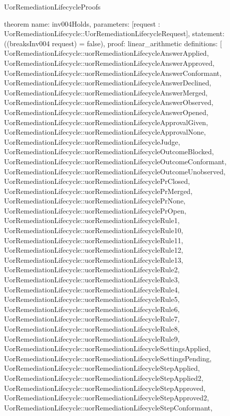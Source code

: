 \begin{lexlean}{UorRemediationLifecycleProofs}
\begin{semanticmodule}
theorem{
  name: inv004Holds,
  parameters: [request : UorRemediationLifecycle::UorRemediationLifecycleRequest],
  statement: ((breaksInv004 request) = false),
  proof: linear_arithmetic{
    definitions: [
      UorRemediationLifecycle::uorRemediationLifecycleAnswerApplied,
      UorRemediationLifecycle::uorRemediationLifecycleAnswerApproved,
      UorRemediationLifecycle::uorRemediationLifecycleAnswerConformant,
      UorRemediationLifecycle::uorRemediationLifecycleAnswerDeclined,
      UorRemediationLifecycle::uorRemediationLifecycleAnswerMerged,
      UorRemediationLifecycle::uorRemediationLifecycleAnswerObserved,
      UorRemediationLifecycle::uorRemediationLifecycleAnswerOpened,
      UorRemediationLifecycle::uorRemediationLifecycleApprovalGiven,
      UorRemediationLifecycle::uorRemediationLifecycleApprovalNone,
      UorRemediationLifecycle::uorRemediationLifecycleJudge,
      UorRemediationLifecycle::uorRemediationLifecycleOutcomeBlocked,
      UorRemediationLifecycle::uorRemediationLifecycleOutcomeConformant,
      UorRemediationLifecycle::uorRemediationLifecycleOutcomeUnobserved,
      UorRemediationLifecycle::uorRemediationLifecyclePrClosed,
      UorRemediationLifecycle::uorRemediationLifecyclePrMerged,
      UorRemediationLifecycle::uorRemediationLifecyclePrNone,
      UorRemediationLifecycle::uorRemediationLifecyclePrOpen,
      UorRemediationLifecycle::uorRemediationLifecycleRule1,
      UorRemediationLifecycle::uorRemediationLifecycleRule10,
      UorRemediationLifecycle::uorRemediationLifecycleRule11,
      UorRemediationLifecycle::uorRemediationLifecycleRule12,
      UorRemediationLifecycle::uorRemediationLifecycleRule13,
      UorRemediationLifecycle::uorRemediationLifecycleRule2,
      UorRemediationLifecycle::uorRemediationLifecycleRule3,
      UorRemediationLifecycle::uorRemediationLifecycleRule4,
      UorRemediationLifecycle::uorRemediationLifecycleRule5,
      UorRemediationLifecycle::uorRemediationLifecycleRule6,
      UorRemediationLifecycle::uorRemediationLifecycleRule7,
      UorRemediationLifecycle::uorRemediationLifecycleRule8,
      UorRemediationLifecycle::uorRemediationLifecycleRule9,
      UorRemediationLifecycle::uorRemediationLifecycleSettingsApplied,
      UorRemediationLifecycle::uorRemediationLifecycleSettingsPending,
      UorRemediationLifecycle::uorRemediationLifecycleStepApplied,
      UorRemediationLifecycle::uorRemediationLifecycleStepApplied2,
      UorRemediationLifecycle::uorRemediationLifecycleStepApproved,
      UorRemediationLifecycle::uorRemediationLifecycleStepApproved2,
      UorRemediationLifecycle::uorRemediationLifecycleStepConformant,
}}
\end{semanticmodule}
\end{lexlean}
